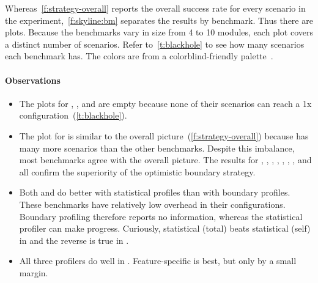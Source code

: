 Whereas~\cref{f:strategy-overall} reports the overall success rate for every
scenario in the experiment,~\cref{f:skyline:bm} separates the results
by benchmark.
Thus there are \numgtp{} plots.
Because the benchmarks vary in size from 4 to 10 modules,
each plot covers a distinct number of scenarios.
Refer to~\cref{t:blackhole} to see how many scenarios each
benchmark has.
The colors are from a colorblind-friendly palette~\cite{w-nature-2011}.

\paragraph{Observations}

\begin{itemize}
  \item
    The plots for , , and 
    are empty because none of their scenarios can reach a 1x configuration~(\cref{t:blackhole}).

  \item
    The plot for  is similar to the overall picture~(\cref{f:strategy-overall})
    because  has many more scenarios than the other benchmarks.
    Despite this imbalance, most benchmarks agree with the overall picture.
    The results for , , ,
    , , , , and 
    all confirm the superiority of the optimistic boundary strategy.

  \item
    Both  and  do better with statistical profiles
    than with boundary profiles.
    These benchmarks have relatively low overhead in their configurations.
    Boundary profiling therefore reports no information, whereas the statistical
    profiler can make progress.
    Curiously, statistical (total) beats statistical (self) in
     and the reverse is true in .

  \item
    All three profilers do well in .
    Feature-specific is best, but only by a small margin.

\end{itemize}

